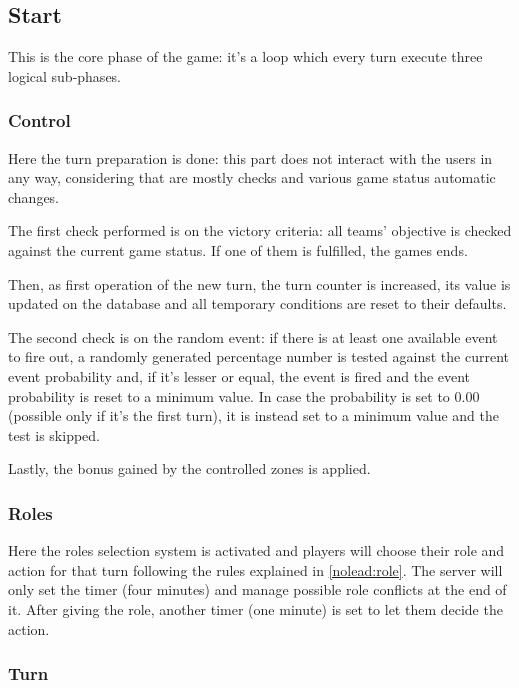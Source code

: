 		\subsection{Start}
			
			This is the core phase of the game: it's a loop which every turn execute three logical sub-phases.
				
			\subsubsection{Control}
			
				Here the turn preparation is done: this part does not interact with the users in any way, considering that are mostly checks and various game status automatic changes.
			
				The first check performed is on the victory criteria: all teams' objective is checked against the current game status. If one of them is fulfilled, the games ends.
				
				Then, as first operation of the new turn, the turn counter is increased, its value is updated on the database and all temporary conditions are reset to their defaults.
				
				The second check is on the random event: if there is at least one available event to fire out, a randomly generated percentage number is tested against the current event probability and, if it's lesser or equal, the event is fired and the event probability is reset to a minimum value.
				In case the probability is set to 0.00 (possible only if it's the first turn), it is instead set to a minimum value and the test is skipped.
				
				Lastly, the bonus gained by the controlled zones is applied.
				
			\subsubsection{Roles}
			
				Here the roles selection system is activated and players will choose their role and action for that turn following the rules explained in \autoref{nolead:role}.
				The server will only set the timer (four minutes) and manage possible role conflicts at the end of it.
				After giving the role, another timer (one minute) is set to let them decide the action.
			
			\subsubsection{Turn}
			
